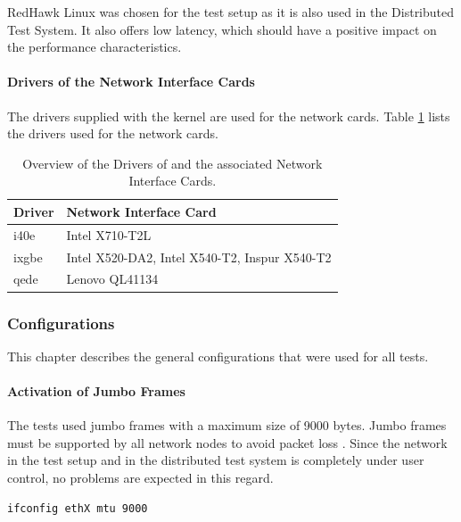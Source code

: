 RedHawk Linux was chosen for the test setup as it is also used in the Distributed Test System. It also offers low latency, which should have a positive impact on the performance characteristics.

\paragraph{Drivers of the Network Interface Cards}

The drivers supplied with the kernel are used for the network cards. Table \ref{tab:drivernic} lists the drivers used for the network cards.

\begin{table}[h]
\centering
\begin{tabular}{ll}
	\toprule
	Driver & Network Interface Card\\
	\midrule
	i40e & Intel X710-T2L\\
	ixgbe & Intel X520-DA2, Intel X540-T2, Inspur X540-T2 \\
	qede & Lenovo QL41134\\
	\bottomrule
\end{tabular}
\caption{Overview of the Drivers of and the associated Network Interface Cards.}
\label{tab:drivernic}
\end{table}

\subsubsection{Configurations}
This chapter describes the general configurations that were used for all tests.

\paragraph{Activation of Jumbo Frames}

The tests used jumbo frames with a maximum size of 9000 bytes. Jumbo frames must be supported by all network nodes to avoid packet loss \cite{swsetup04}. Since the network in the test setup and in the distributed test system is completely under user control, no problems are expected in this regard. \\

\begin{lstlisting}[language=Bash, caption=Configuration of Jumbo Frames for the ethX Interface., label=lst:jumbocongif]
ifconfig ethX mtu 9000
\end{lstlisting}

